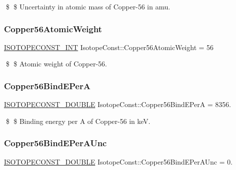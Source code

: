 \$ \$ Uncertainty in atomic mass of Copper-\/56 in amu. \mbox{\label{group___isotope_const-_copper-_cu56_gaf27ef58a336a7a7571889d3baedc8aac}} 
\subsubsection{\texorpdfstring{Copper56\+Atomic\+Weight}{Copper56AtomicWeight}}
{\footnotesize\ttfamily \mbox{\hyperlink{group___isotope_const-_macros_ga5f18360b3e99483a35c32d789e62621c}{I\+S\+O\+T\+O\+P\+E\+C\+O\+N\+S\+T\+\_\+\+I\+NT}} Isotope\+Const\+::\+Copper56\+Atomic\+Weight = 56}

\$ \$ Atomic weight of Copper-\/56. \mbox{\label{group___isotope_const-_copper-_cu56_ga2acc7cd3d03ce4e660210ed96e9248cf}} 
\subsubsection{\texorpdfstring{Copper56\+Bind\+E\+PerA}{Copper56BindEPerA}}
{\footnotesize\ttfamily \mbox{\hyperlink{group___isotope_const-_macros_ga8f45a7272ce02c0b4c65c44636ed719a}{I\+S\+O\+T\+O\+P\+E\+C\+O\+N\+S\+T\+\_\+\+D\+O\+U\+B\+LE}} Isotope\+Const\+::\+Copper56\+Bind\+E\+PerA = 8356.}

\$ \$ Binding energy per A of Copper-\/56 in keV. \mbox{\label{group___isotope_const-_copper-_cu56_ga7c985a56af44c5d72c16d547d6cdd491}} 
\subsubsection{\texorpdfstring{Copper56\+Bind\+E\+Per\+A\+Unc}{Copper56BindEPerAUnc}}
{\footnotesize\ttfamily \mbox{\hyperlink{group___isotope_const-_macros_ga8f45a7272ce02c0b4c65c44636ed719a}{I\+S\+O\+T\+O\+P\+E\+C\+O\+N\+S\+T\+\_\+\+D\+O\+U\+B\+LE}} Isotope\+Const\+::\+Copper56\+Bind\+E\+Per\+A\+Unc = 0.}

